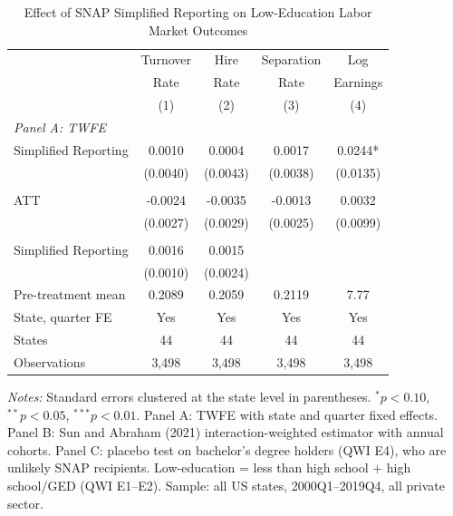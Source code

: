 \begin{table}[htbp]
\centering
\caption{Effect of SNAP Simplified Reporting on Low-Education Labor Market Outcomes}
\label{tab:main}
\begin{tabular}{lcccc}
\toprule
 & Turnover & Hire & Separation & Log \\
 & Rate & Rate & Rate & Earnings \\
 & (1) & (2) & (3) & (4) \\
\midrule
\multicolumn{5}{l}{\textit{Panel A: TWFE}} \\
Simplified Reporting & 0.0010 & 0.0004 & 0.0017 & 0.0244* \\
 & (0.0040) & (0.0043) & (0.0038) & (0.0135) \\
\addlinespace
\multicolumn{5}{l}{\textit{Panel B: Sun-Abraham (2021)}} \\
ATT & -0.0024 & -0.0035 & -0.0013 & 0.0032 \\
 & (0.0027) & (0.0029) & (0.0025) & (0.0099) \\
\addlinespace
\multicolumn{5}{l}{\textit{Panel C: Placebo (Bachelor's+)}} \\
Simplified Reporting & 0.0016 & 0.0015 & & \\
 & (0.0010) & (0.0024) & & \\
\midrule
Pre-treatment mean & 0.2089 & 0.2059 & 0.2119 & 7.77 \\
State, quarter FE & Yes & Yes & Yes & Yes \\
States & 44 & 44 & 44 & 44 \\
Observations & 3,498 & 3,498 & 3,498 & 3,498 \\
\bottomrule
\end{tabular}
\begin{tablenotes}[flushleft]
\small
\item \textit{Notes:} Standard errors clustered at the state level in parentheses. $^{*}p<0.10$, $^{**}p<0.05$, $^{***}p<0.01$. Panel A: TWFE with state and quarter fixed effects. Panel B: Sun and Abraham (2021) interaction-weighted estimator with annual cohorts. Panel C: placebo test on bachelor's degree holders (QWI E4), who are unlikely SNAP recipients. Low-education = less than high school + high school/GED (QWI E1--E2). Sample: all US states, 2000Q1--2019Q4, all private sector.
\end{tablenotes}
\end{table}

